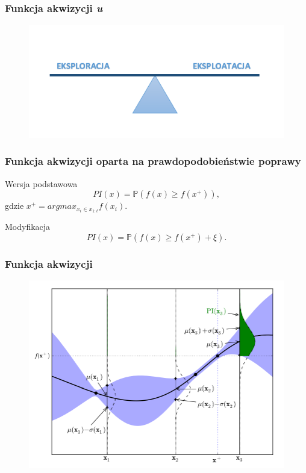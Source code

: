 \documentclass[handout]{beamer}
\begin{document}
\begin{frame}
\frametitle{Funkcja akwizycji \textit{u}}
\begin{center}
\begin{figure}
\includegraphics[scale=0.8]{eks.png}
\end{figure}
\end{center}
\end{frame}

\begin{frame}
\frametitle{Funkcja akwizycji oparta na prawdopodobieństwie poprawy}
\begin{block}{Wersja podstawowa}
\begin{equation*}
PI(x) = \mathbb{P}(f(x)\geq f(x^{+})),
\end{equation*}
gdzie $x^{+} = argmax_{x_i \in x_{1:t}} f(x_i)$.
\end{block}
\pause
\begin{block}{Modyfikacja}
\begin{equation*}
PI(x) = \mathbb{P}(f(x)\geq f(x^{+}) + \xi).
\end{equation*}
\end{block}
\end{frame}

\begin{frame}
\frametitle{Funkcja akwizycji}
\begin{center}
\begin{figure}
\includegraphics[scale=0.45]{imp.png}
\end{figure}
\end{center}
\end{frame}
\end{document}

